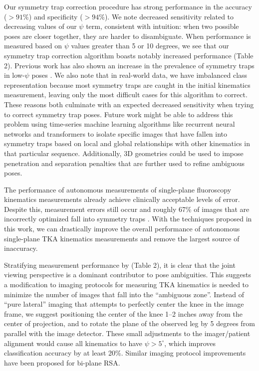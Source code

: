 Our symmetry trap correction procedure has strong performance in the accuracy ($>91\%$) and specificity ($>94\%$).
We note decreased sensitivity related to decreasing values of our $\psi$ term, consistent with intuition: when two possible poses are closer together, they are harder to disambiguate.
When performance is measured based on $\psi$ values greater than 5 or 10 degrees, we see that our symmetry trap correction algorithm boasts notably increased performance (Table 2).
Previous work has also shown an increase in the prevalence of symmetry traps in low-$\psi$ poses \cite{jensenJointTrackMachine2023}.
We also note that in real-world data, we have imbalanced class representation because most symmetry traps are caught in the initial kinematics measurement, leaving only the most difficult cases for this algorithm to correct.
These reasons both culminate with an expected decreased sensitivity when trying to correct symmetry trap poses.
Future work might be able to address this problem using time-series machine learning algorithms like recurrent neural networks \cite{hochreiterLongShortTermMemory1997} and transformers \cite{vaswaniAttentionAllYou2017} to isolate specific images that have fallen into symmetry traps based on local and global relationships with other kinematics in that particular sequence.
Additionally, 3D geometries could be used to impose penetration and separation penalties that are further used to refine ambiguous poses.


The performance of autonomous measurements of single-plane fluoroscopy kinematics measurements already achieve clinically acceptable levels of error.
Despite this, measurement errors still occur and roughly 67\% of images that are incorrectly optimized fall into symmetry traps \cite{jensenJointTrackMachine2023,brobergValidationMachineLearning2023}.
With the techniques proposed in this work, we can drastically improve the overall performance of autonomous single-plane TKA kinematics measurements and remove the largest source of inaccuracy.


Stratifying measurement performance by  (Table 2), it is clear that the joint viewing perspective is a dominant contributor to pose ambiguities.
This suggests a modification to imaging protocols for measuring TKA kinematics is needed to minimize the number of images that fall into the “ambiguous zone”.
Instead of “pure lateral” imaging that attempts to perfectly center the knee in the image frame, we suggest positioning the center of the knee 1–2 inches away from the center of projection, and to rotate the plane of the observed leg by 5 degrees from parallel with the image detector.
These small adjustments to the imager/patient alignment would cause all kinematics to have $\psi > 5^{\circ}$, which improves classification accuracy by at least 20\%. Similar imaging protocol improvements have been proposed for bi-plane RSA\cite{niesenReorientingTibialBaseplate2020}.

